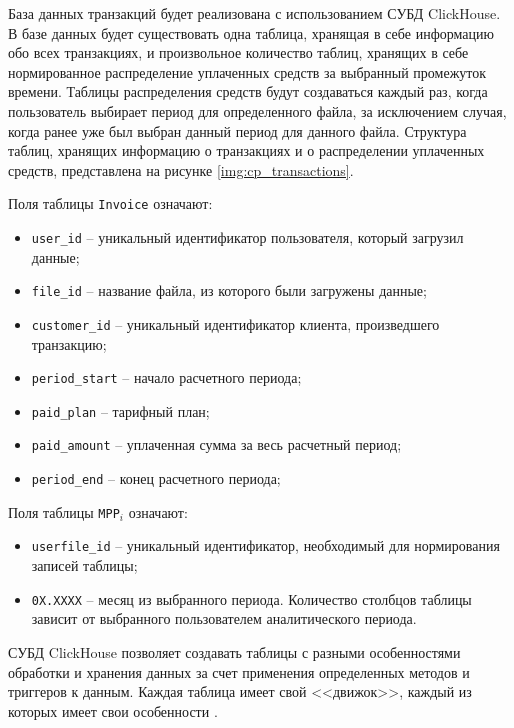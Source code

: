 База данных транзакций будет реализована с использованием СУБД ClickHouse. В базе данных будет существовать одна таблица, хранящая в себе информацию обо всех транзакциях, и произвольное количество таблиц, хранящих в себе нормированное распределение уплаченных средств за выбранный промежуток времени. Таблицы распределения средств будут создаваться каждый раз, когда пользователь выбирает период для определенного файла, за исключением случая, когда ранее уже был выбран данный период для данного файла. Структура таблиц, хранящих информацию о транзакциях и о распределении уплаченных средств, представлена на рисунке \ref{img:cp_transactions}.


Поля таблицы \texttt{Invoice} означают:

\begin{itemize}
	\item \texttt{user\_id} -- уникальный идентификатор пользователя, который загрузил данные;
	\item \texttt{file\_id} -- название файла, из которого были загружены данные;
	\item \texttt{customer\_id} -- уникальный идентификатор клиента, произведшего транзакцию;
	\item \texttt{period\_start} -- начало расчетного периода;
	\item \texttt{paid\_plan} -- тарифный план;
	\item \texttt{paid\_amount} -- уплаченная сумма за весь расчетный период;
	\item \texttt{period\_end} -- конец расчетного периода;
\end{itemize}

Поля таблицы \texttt{MPP$_i$} означают:

\begin{itemize}
	\item \texttt{userfile\_id} -- уникальный идентификатор, необходимый для нормирования записей таблицы;
	\item \texttt{0X.XXXX} -- месяц из выбранного периода. Количество столбцов таблицы зависит от выбранного пользователем аналитического периода.
\end{itemize}

СУБД ClickHouse позволяет создавать таблицы с разными особенностями обработки и хранения данных за счет применения определенных методов и триггеров к данным. Каждая таблица имеет свой <<движок>>, каждый из которых имеет свои особенности \cite{chengines}.

